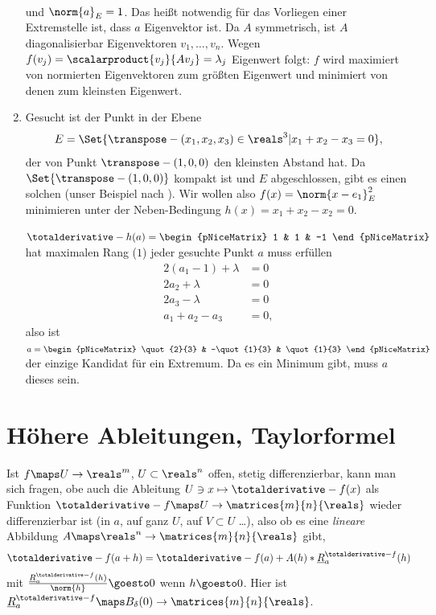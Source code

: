 \begin{beispiele*}
\begin{enumerate}
\begin{align*}
    \end{align*}
    und \( \norm{a}_E=1 \). Das heißt notwendig für das Vorliegen einer Extremstelle ist, dass \( a \) Eigenvektor ist. Da \( A \) symmetrisch, ist \( A \) diagonalisierbar \timplies \texists  Eigenvektoren \( v_1,\dotsc, v_n \). Wegen \( f(v_j)=\scalarproduct{v_j}{A v_j}=\lambda_j \) Eigenwert folgt: \( f \) wird maximiert von normierten Eigenvektoren zum größten Eigenwert und minimiert von denen zum kleinsten Eigenwert.
    \item Gesucht ist der Punkt in der Ebene
    \begin{equation*}
      E=\Set{\transpose-{(x_1,x_2,x_3)}\in \reals^3|x_1+x_2-x_3=0},
    \end{equation*}
    der von Punkt \( \transpose-{(1,0,0)} \) den kleinsten Abstand hat. Da \( \Set{\transpose-{(1,0,0)}} \) kompakt ist und \( E \) abgeschlossen, gibt es einen solchen (\vgl unser Beispiel nach ). Wir wollen also \( f(x)=\norm{x-e_1}_E^2 \) minimieren unter der Neben-Bedingung \( h(x)=x_1+x_2-x_2=0 \).

    \( \totalderivative-{h}(a)=\begin{pNiceMatrix} 1 & 1 & -1 \end{pNiceMatrix} \) hat maximalen Rang (\( 1 \)) \dh jeder gesuchte Punkt \( a  \) muss erfüllen
      \begin{align*}
        2(a_1-1)+\lambda&=0\\
        2a_2+\lambda&=0\\
        2a_3-\lambda&=0\\
        a_1+a_2-a_3&=0,
      \end{align*}
    also ist \( a=\begin{pNiceMatrix} \quot{2}{3} & -\quot{1}{3} & \quot{1}{3} \end{pNiceMatrix} \) der einzige Kandidat für ein Extremum. Da es ein Minimum gibt, muss \( a \) dieses sein.
    \end{enumerate}
\end{beispiele*}
\section{Höhere Ableitungen, Taylorformel}
Ist \( f\maps U\to \reals^m \), \( U\subset \reals^n \) offen, stetig differenzierbar, kann man sich fragen, obe auch die Ableitung \( U\ni x\mapsto \totalderivative-{f}(x) \) als Funktion \( \totalderivative-{f}\maps U\to \matrices{m}{n}{\reals} \) wieder differenzierbar ist (in \( a \), auf ganz \( U \), auf \( V\subset U \) \dots), also ob es eine \emph{lineare} Abbildung \( A\maps \reals^n\to \matrices{m}{n}{\reals} \) gibt, \sd 
\begin{equation*}
  \totalderivative-{f}(a+h)=\totalderivative-{f}(a)+A(h)*\underline{R}_a^{\totalderivative-{f}}(h)
\end{equation*}
mit \( \frac{\underline{R}_a^{\totalderivative-{f}}(h)}{\norm{h}}\goesto 0 \) wenn \( h\goesto 0 \). Hier ist \( \underline{R}_a^{\totalderivative-{f}}\maps B_{\delta}(0)\to \matrices{m}{n}{\reals} \). 

